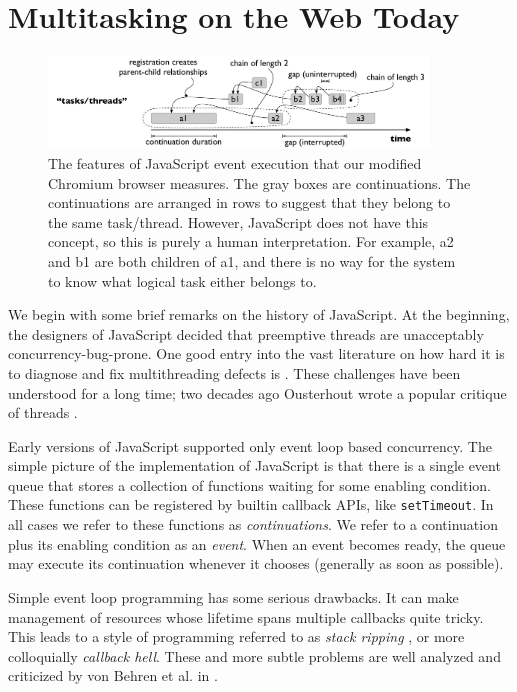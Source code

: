 \documentclass[sigplan,10pt,review,anonymous]{acmart}\settopmatter{printfolios=true,printccs=false,printacmref=false}
\begin{document}
\section{Multitasking on the Web Today}

\begin{figure}
\includegraphics[width=0.9\textwidth]{continuation_tree}
\caption{The features of JavaScript event execution that our modified Chromium browser measures.
  The gray boxes are continuations.
  The continuations are arranged in rows to suggest that they belong to the same task/thread.
  However, JavaScript does not have this concept, so this is purely a human interpretation.
  For example, a2 and b1 are both children of a1, and there is no way for the system to know what logical task either belongs to.}
\label{fig:continuation_tree}
\end{figure}

We begin with some brief remarks on the history of JavaScript.
At the beginning, the designers of JavaScript decided that preemptive threads are unacceptably concurrency-bug-prone.
One good entry into the vast literature on how hard it is to diagnose and fix multithreading defects is \cite{Lu2008}.
These challenges have been understood for a long time; two decades ago Ousterhout wrote a popular critique of threads \cite{Ousterhout1996}.

Early versions of JavaScript supported only event loop based concurrency.
The simple picture of the implementation of JavaScript is that there is a single event queue that stores a collection of functions waiting for some enabling condition.
These functions can be registered by builtin callback APIs, like \texttt{setTimeout}.
In all cases we refer to these functions as \emph{continuations}.
We refer to a continuation plus its enabling condition as an \emph{event}.
When an event becomes ready, the queue may execute its continuation whenever it chooses (generally as soon as possible).

Simple event loop programming has some serious drawbacks.
It can make management of resources whose lifetime spans multiple callbacks quite tricky.
This leads to a style of programming referred to as \emph{stack ripping} \cite{Adya2002}, or more colloquially \emph{callback hell}.
These and more subtle problems are well analyzed and criticized by von Behren et al. in \cite{Behren2003a}.
\end{document}
